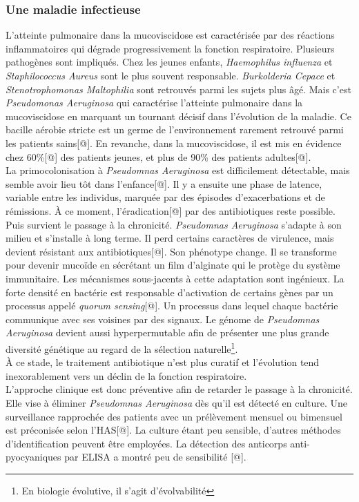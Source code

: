\documentclass[12pt,a4paper]{article}
\begin{document}
\subsubsection{Une maladie infectieuse}

L’atteinte pulmonaire dans la mucoviscidose est caractérisée par des réactions inflammatoires qui dégrade progressivement la fonction respiratoire. Plusieurs pathogènes sont impliqués. Chez les jeunes enfants, \textit{Haemophilus influenza} et \textit{Staphilococcus Aureus} sont le plus souvent responsable. \textit{Burkolderia Cepace} et \textit{Stenotrophomonas Maltophilia} sont retrouvés parmi les sujets plus âgé.
Mais c’est \textit{Pseudomonas Aeruginosa} qui caractérise l’atteinte pulmonaire dans la mucoviscidose en marquant un tournant décisif dans l’évolution de la maladie. Ce bacille aérobie stricte est un germe de l'environnement rarement retrouvé parmi les patients sains[@]. En revanche, dans la mucoviscidose, il est mis en évidence chez 60\%[@] des patients jeunes, et plus de 90\% des patients adultes[@].\\
La primocolonisation à \textit{Pseudomnas Aeruginosa} est difficilement détectable, mais semble avoir lieu tôt dans l’enfance[@]. Il y a ensuite une phase de latence, variable entre les individus, marquée par des épisodes d’exacerbations et de rémissions. À ce moment, l’éradication[@] par des antibiotiques reste possible.
Puis survient le passage à la chronicité. \textit{Pseudomnas Aeruginosa} s'adapte à son milieu et s’installe à long terme. Il perd certains caractères de virulence, mais devient résistant aux antibiotiques[@]. Son phénotype change. Il se transforme pour devenir mucoïde en sécrétant un film d’alginate qui le protège du système immunitaire. Les mécanismes sous-jacents à cette adaptation sont ingénieux. La forte densité en bactérie est responsable d’activation de certains gènes par un processus appelé \textit{quorum sensing}[@]. Un processus dans lequel chaque bactérie communique avec ses voisines par des signaux.
Le génome de \textit{Pseudomnas Aeruginosa} devient aussi hyperpermutable afin de présenter une plus grande diversité génétique au regard de la sélection naturelle\footnote{En biologie évolutive, il s'agit d'évolvabilité}. \\
À ce stade, le traitement antibiotique n’est plus curatif et l'évolution tend inexorablement vers un déclin de la fonction respiratoire. \\
L'approche clinique est donc préventive afin de retarder le passage à la chronicité. Elle vise à éliminer \textit{Pseudomnas Aeruginosa} dès qu'il est détecté en culture. Une surveillance rapprochée des patients avec un prélèvement mensuel ou bimensuel est préconisée selon l'HAS[@]. La culture étant peu sensible, d’autres méthodes d'identification peuvent être employées. La détection des anticorps anti-pyocyaniques par ELISA a montré peu de sensibilité [@].
\end{document}
